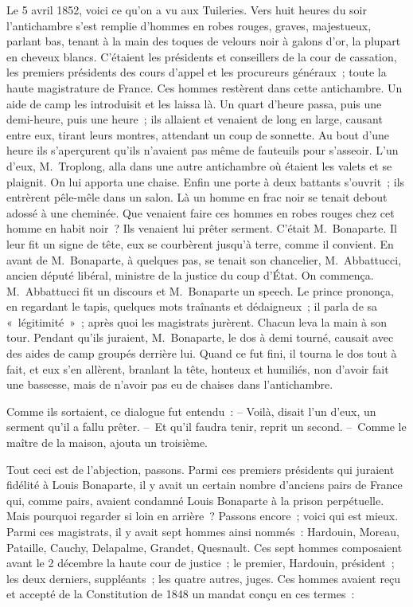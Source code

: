 \documentclass[french,twoside]{book} %
\begin{document}
\noindent Le 5 avril 1852, voici ce qu’on a vu aux Tuileries. Vers huit heures du soir l’antichambre s’est remplie d’hommes en robes rouges, graves, majestueux, parlant bas, tenant à la main des toques de velours noir à galons d’or, la plupart en cheveux blancs. C’étaient les présidents et conseillers de la cour de cassation, les premiers présidents des cours d’appel et les procureurs généraux ; toute la haute magistrature de France. Ces hommes restèrent dans cette antichambre. Un aide de camp les introduisit et les laissa là. Un quart d’heure passa, puis une demi-heure, puis une heure ; ils allaient et venaient de long en large, causant entre eux, tirant leurs montres, attendant un coup de sonnette. Au bout d’une heure ils s’aperçurent qu’ils n’avaient pas même de fauteuils pour s’asseoir. L’un d’eux, M. Troplong, alla dans une autre antichambre où étaient les valets et se plaignit. On lui apporta une chaise. Enfin une porte à deux battants s’ouvrit ; ils entrèrent pêle-mêle dans un salon. Là un homme en frac noir se tenait debout adossé à une cheminée. Que venaient faire ces hommes en robes rouges chez cet homme en habit noir ? Ils venaient lui prêter serment. C’était M. Bonaparte. Il leur fit un signe de tête, eux se courbèrent jusqu’à terre, comme il convient. En avant de M. Bonaparte, à quelques pas, se tenait son chancelier, M. Abbattucci, ancien député libéral, ministre de la justice du coup d’État. On commença. M. Abbattucci fit un discours et M. Bonaparte un speech. Le prince prononça, en regardant le tapis, quelques mots traînants et dédaigneux ; il parla de sa « légitimité » ; après quoi les magistrats jurèrent. Chacun leva la main à son tour. Pendant qu’ils juraient, M. Bonaparte, le dos à demi tourné, causait avec des aides de camp groupés derrière lui. Quand ce fut fini, il tourna le dos tout à fait, et eux s’en allèrent, branlant la tête, honteux et humiliés, non d’avoir fait une bassesse, mais de n’avoir pas eu de chaises dans l’antichambre.\par
Comme ils sortaient, ce dialogue fut entendu : – Voilà, disait l’un d’eux, un serment qu’il a fallu prêter. – Et qu’il faudra tenir, reprit un second. – Comme le maître de la maison, ajouta un troisième.\par
Tout ceci est de l’abjection, passons. Parmi ces premiers présidents qui juraient fidélité à Louis Bonaparte, il y avait un certain nombre d’anciens pairs de France qui, comme pairs, avaient condamné Louis Bonaparte à la prison perpétuelle. Mais pourquoi regarder si loin en arrière ? Passons encore ; voici qui est mieux. Parmi ces magistrats, il y avait sept hommes ainsi nommés : Hardouin, Moreau, Pataille, Cauchy, Delapalme, Grandet, Quesnault. Ces sept hommes composaient avant le 2 décembre la haute cour de justice ; le premier, Hardouin, président ; les deux derniers, suppléants ; les quatre autres, juges. Ces hommes avaient reçu et accepté de la Constitution de 1848 un mandat conçu en ces termes :\par
\end{document}
